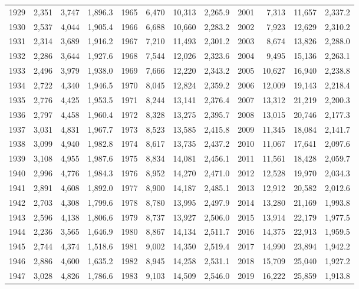 \begin{longtable}{rrrr@{\hspace{1em}}rrrr@{\hspace{1em}}rrrr}
1929 & 2,351 & 3,747 & 1,896.3 & 1965 & 6,470 & 10,313 & 2,265.9 & 2001 & 7,313 & 11,657 & 2,337.2 \\
1930 & 2,537 & 4,044 & 1,905.4 & 1966 & 6,688 & 10,660 & 2,283.2 & 2002 & 7,923 & 12,629 & 2,310.2 \\
1931 & 2,314 & 3,689 & 1,916.2 & 1967 & 7,210 & 11,493 & 2,301.2 & 2003 & 8,674 & 13,826 & 2,288.0 \\
1932 & 2,286 & 3,644 & 1,927.6 & 1968 & 7,544 & 12,026 & 2,323.6 & 2004 & 9,495 & 15,136 & 2,263.1 \\
1933 & 2,496 & 3,979 & 1,938.0 & 1969 & 7,666 & 12,220 & 2,343.2 & 2005 & 10,627 & 16,940 & 2,238.8 \\
1934 & 2,722 & 4,340 & 1,946.5 & 1970 & 8,045 & 12,824 & 2,359.2 & 2006 & 12,009 & 19,143 & 2,218.4 \\
1935 & 2,776 & 4,425 & 1,953.5 & 1971 & 8,244 & 13,141 & 2,376.4 & 2007 & 13,312 & 21,219 & 2,200.3 \\
1936 & 2,797 & 4,458 & 1,960.4 & 1972 & 8,328 & 13,275 & 2,395.7 & 2008 & 13,015 & 20,746 & 2,177.3 \\
1937 & 3,031 & 4,831 & 1,967.7 & 1973 & 8,523 & 13,585 & 2,415.8 & 2009 & 11,345 & 18,084 & 2,141.7 \\
1938 & 3,099 & 4,940 & 1,982.8 & 1974 & 8,617 & 13,735 & 2,437.2 & 2010 & 11,067 & 17,641 & 2,097.6 \\
1939 & 3,108 & 4,955 & 1,987.6 & 1975 & 8,834 & 14,081 & 2,456.1 & 2011 & 11,561 & 18,428 & 2,059.7 \\
1940 & 2,996 & 4,776 & 1,984.3 & 1976 & 8,952 & 14,270 & 2,471.0 & 2012 & 12,528 & 19,970 & 2,034.3 \\
1941 & 2,891 & 4,608 & 1,892.0 & 1977 & 8,900 & 14,187 & 2,485.1 & 2013 & 12,912 & 20,582 & 2,012.6 \\
1942 & 2,703 & 4,308 & 1,799.6 & 1978 & 8,780 & 13,995 & 2,497.9 & 2014 & 13,280 & 21,169 & 1,993.8 \\
1943 & 2,596 & 4,138 & 1,806.6 & 1979 & 8,737 & 13,927 & 2,506.0 & 2015 & 13,914 & 22,179 & 1,977.5 \\
1944 & 2,236 & 3,565 & 1,646.9 & 1980 & 8,867 & 14,134 & 2,511.7 & 2016 & 14,375 & 22,913 & 1,959.5 \\
1945 & 2,744 & 4,374 & 1,518.6 & 1981 & 9,002 & 14,350 & 2,519.4 & 2017 & 14,990 & 23,894 & 1,942.2 \\
1946 & 2,886 & 4,600 & 1,635.2 & 1982 & 8,945 & 14,258 & 2,531.1 & 2018 & 15,709 & 25,040 & 1,927.2 \\
1947 & 3,028 & 4,826 & 1,786.6 & 1983 & 9,103 & 14,509 & 2,546.0 & 2019 & 16,222 & 25,859 & 1,913.8 \\

\end{longtable}

